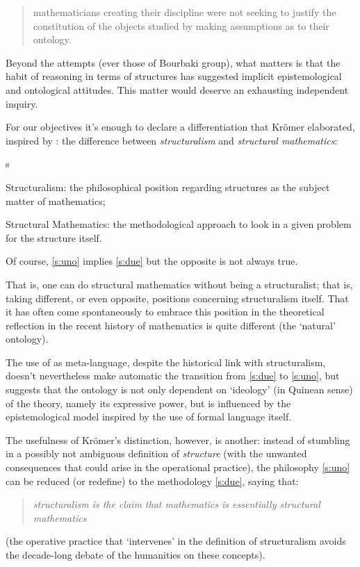 \begin{quote}
    mathematicians creating their discipline were not seeking to justify the constitution of the objects studied by making assumptions as to their ontology.\hfill  \cite{kromer2007tool}
\end{quote}
Beyond the attempts (ever those of Bourbaki group), what matters is that the habit of reasoning in terms of structures has suggested implicit epistemological and ontological attitudes. This matter would deserve an exhausting independent inquiry.

For our objectives it's enough to declare a differentiation that Kr\"omer
elaborated, inspired by \cite{Cor96}: the difference between \emph{structuralism} and \emph{structural mathematics}:
\begin{enumtag}{s}
    \item \label{s:uno} Structuralism: the philosophical position regarding structures as the subject matter of mathematics;
    \item \label{s:due} Structural Mathematics: the methodological approach to look in a given problem for the structure itself.
\end{enumtag}
Of course, \ref{s:uno} implies \ref{s:due} but the opposite is not always true.
\begin{remark} \label{weak_structuralism}
    That is, one can do structural mathematics without being a structuralist; that is, taking different, or even opposite, positions concerning structuralism itself. That it has often come spontaneously to embrace this position in the theoretical reflection in the recent history of mathematics is quite different (the `natural' ontology).

    The use of  as meta-language, despite the historical link with structuralism, doesn't nevertheless make automatic the transition from
    \ref{s:due} to  \ref{s:uno}, but suggests that the ontology is not only
    dependent on `ideology' (in Quinean sense) of the theory, namely its expressive power, but is influenced by the epistemological model inspired by the use of formal language itself.
\end{remark}
The usefulness of Kr\"omer's distinction, however, is another: instead of stumbling in a possibly not ambiguous definition of \textit{structure} (with the unwanted consequences that could arise in the operational practice), the philosophy \ref{s:uno} can be reduced (or redefine) to the methodology \ref{s:due}, saying that:
\begin{quote}
    \emph{structuralism is the claim that mathematics
        is essentially structural mathematics} \cite{kromer2007tool}
\end{quote}
(the operative practice that `intervenes' in the definition of structuralism avoids the decade-long debate of the humanities on these concepts).

